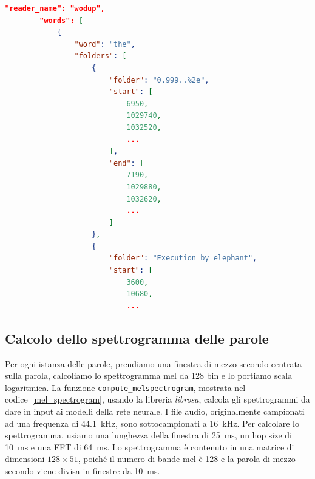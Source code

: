 \documentclass[12pt,a4paper,titlepage]{article}
\begin{document}
\begin{lstlisting}[language=iPython,firstnumber=1, caption=words\_per\_reader.py, label=words_per_reader,captionpos=b]
\end{lstlisting}
	
\begin{lstlisting}[language=json,firstnumber=1, caption=Formato del file readers\_words.json, label=readers_words,captionpos=b]
"reader_name": "wodup",
		"words": [
			{
				"word": "the",
				"folders": [
					{
						"folder": "0.999..%2e",
						"start": [
							6950,
							1029740,
							1032520,
							...
						],
						"end": [
							7190,
							1029880,
							1032620,
							...
						]
					},
					{
						"folder": "Execution_by_elephant",
						"start": [
							3600,
							10680,
							...
\end{lstlisting}

\subsection{Calcolo dello spettrogramma delle parole}
\label{subsec:spettrogramma}
Per ogni istanza delle parole, prendiamo una finestra di mezzo secondo centrata sulla parola, calcoliamo lo spettrogramma mel da 128 bin e lo portiamo scala logaritmica. La funzione \texttt{compute\_melspectrogram}, mostrata nel codice~\ref{mel_spectrogram}, usando la libreria \emph{librosa}, calcola gli spettrogrammi da dare in input ai modelli della rete neurale. I file audio, originalmente campionati ad una frequenza di \SI{44.1}{\kilo \hertz}, sono sottocampionati a \SI{16}{\kilo \hertz}. Per calcolare lo spettrogramma, usiamo una lunghezza della finestra di \SI{25}{\milli \second}, un hop size di \SI{10}{\milli \second} e una FFT di \SI{64}{\milli \second}. Lo spettrogramma è contenuto in una matrice di dimensioni $128 \times 51$, poiché il numero di bande mel è 128 e la parola di mezzo secondo viene divisa in finestre da \SI{10}{\milli \second}.
\end{document}
